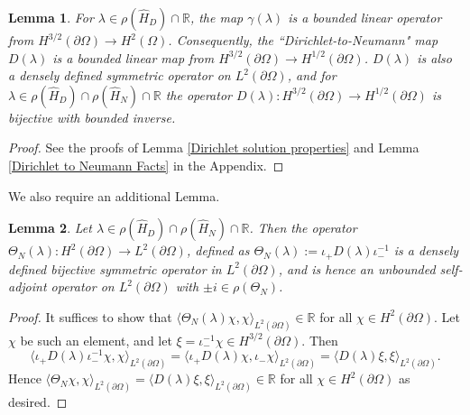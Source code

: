 \documentclass{article}
\numberwithin{equation}{section}
\newtheorem{lemma}{Lemma}[section]
\begin{document}
    \begin{lemma}\label{maps properties}
        For $\lambda \in \rho(\hat{H}_D)\cap \mathbb{R}$, the map $\gamma(\lambda)$ is a bounded linear operator from $H^{3/2}(\partial \Omega)\to H^2(\Omega)$. Consequently, the ``Dirichlet-to-Neumann" map $D(\lambda)$ is a bounded linear map from $H^{3/2}(\partial \Omega)\to H^{1/2}(\partial \Omega)$. $D(\lambda)$ is also a densely defined symmetric operator on $L^2(\partial \Omega)$, and for $\lambda \in \rho(\hat{H}_D)\cap \rho(\hat{H}_N)\cap\mathbb{R}$ the operator $D(\lambda):H^{3/2}(\partial \Omega)\to H^{1/2}(\partial \Omega)$ is bijective with bounded inverse.
    \end{lemma}
\begin{proof}
    See the proofs of Lemma \ref{Dirichlet solution properties} and Lemma \ref{Dirichlet to Neumann Facts} in the Appendix.
\end{proof}
We also require an additional Lemma.
\begin{lemma}
    Let $\lambda \in \rho(\hat{H}_D)\cap \rho(\hat{H}_N)\cap \mathbb{R}$. Then the operator $\Theta_N(\lambda) :H^2(\partial \Omega)\to L^2(\partial \Omega)$, defined as $\Theta_N(\lambda):=\iota_+ D(\lambda)\iota_-^{-1}$ is a densely defined bijective symmetric operator in $L^2(\partial \Omega)$, and is hence an unbounded self-adjoint operator on $L^2(\partial \Omega)$ with $\pm i \in \rho(\Theta_N)$.
\end{lemma}
\begin{proof}
    It suffices to show that $\langle \Theta_N(\lambda) \chi, \chi \rangle_{L^2(\partial \Omega)}\in \mathbb{R}$ for all $\chi \in H^2(\partial \Omega)$. Let $\chi$ be such an element, and let $\xi=\iota_-^{-1}\chi \in H^{3/2}(\partial \Omega)$. Then
    \begin{equation}
        \langle \iota_+ D(\lambda)\iota_-^{-1}\chi,\chi \rangle_{L^2(\partial \Omega)}=\langle \iota_+ D(\lambda)\chi,\iota_-\chi \rangle_{L^2(\partial \Omega)}=\langle  D(\lambda)\xi,\xi \rangle_{L^2(\partial \Omega)}.
    \end{equation}
    Hence $\langle \Theta_N \chi,\chi \rangle_{L^2(\partial \Omega)}=\langle  D(\lambda)\xi,\xi \rangle_{L^2(\partial \Omega)}\in \mathbb{R}$ for all $\chi \in H^2(\partial \Omega)$ as desired.
\end{proof}
\end{document}
